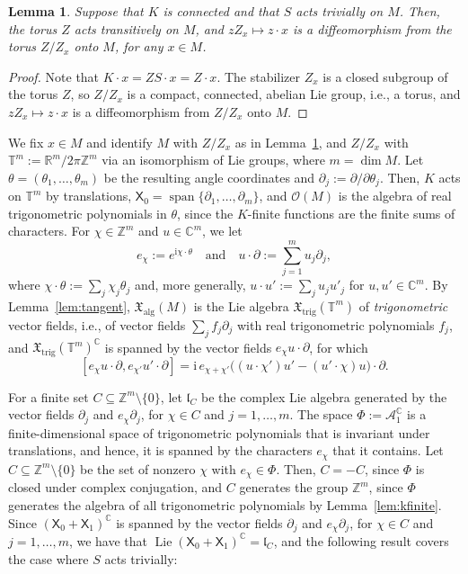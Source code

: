 \documentclass{article}
\newcommand{\R}{\mathbb{R}}
\newcommand{\C}{\mathbb{C}}
\newcommand{\Z}{\mathbb{Z}}
\newcommand{\T}{\mathbb{T}}
\newcommand{\xalg}{\mathfrak X_{\mathrm{alg}}}
\newcommand{\xtrig}{\mathfrak X_{\mathrm{trig}}}
\newcommand{\sX}{\mathsf{X}}
\newcommand{\Ocal}{\mathcal{O}}
\newtheorem{lemma}{Lemma}
\theoremstyle{definition}
\theoremstyle{plain}
\begin{document}
\begin{lemma}\label{lem:torus-structure}
 Suppose that $K$ is connected and that $S$ acts trivially on $M$.
Then, the torus $Z$ acts transitively on $M$, and $zZ_x\mapsto z\cdot x$ is a diffeomorphism from the torus $Z/Z_x$ onto $M$, for any $x\in M$.
\end{lemma}

\begin{proof}
 Note that $K\cdot x=ZS\cdot x=Z\cdot x$.
The stabilizer $Z_x$ is a closed subgroup of the torus $Z$, so $Z/Z_x$ is a compact, connected, abelian Lie group, i.e., a torus, and $zZ_x\mapsto z\cdot x$ is a diffeomorphism from $Z/Z_x$ onto $M$.
\end{proof}

We fix $x\in M$ and identify $M$ with $Z/Z_x$ as in Lemma~\ref{lem:torus-structure}, and $Z/Z_x$ with $\T^m:=\R^m/2\pi\Z^m$ via an isomorphism of Lie groups, where $m=\dim M$.
Let $\theta=(\theta_1,\ldots,\theta_m)$ be the resulting angle coordinates and $\partial_j:=\partial/\partial\theta_j$.
Then, $K$ acts on $\T^m$ by translations, $\sX_0=\operatorname{span}\{\partial_1,\ldots,\partial_m\}$,
and $\Ocal(M)$ is the algebra of real trigonometric polynomials in $\theta$, since the $K$-finite functions are the finite sums of characters.
For $\chi\in\Z^m$ and $u\in\C^m$, we let
$$
    e_\chi:=e^{\mathrm{i}\chi\cdot\theta}
    \quad\mbox{and}\quad
    u\cdot\partial:=\sum_{j=1}^mu_j\partial_j,
$$
where $\chi\cdot\theta:=\sum_j\chi_j\theta_j$ and, more generally, $u\cdot u':=\sum_ju_ju'_j$ for $u,u'\in\C^m$.
By Lemma~\ref{lem:tangent}, $\xalg(M)$ is the Lie algebra $\xtrig(\T^m)$ of {\it trigonometric} vector fields, i.e., of vector fields $\sum_jf_j\partial_j$ with real trigonometric polynomials $f_j$,
and $\xtrig(\T^m)^\C$ is spanned by the vector fields $e_\chi u\cdot\partial$, for which
\begin{equation}\label{eq:torus-bracket}
[e_\chi u\cdot\partial,e_{\chi'}u'\cdot\partial]=\mathrm{i}\,e_{\chi+\chi'}\bigl((u\cdot\chi')u'-(u'\cdot\chi)u\bigr)\cdot\partial.
\end{equation}

For a finite set $C\subseteq\Z^m\setminus\{0\}$, let $\mathfrak l_C$ be the complex Lie algebra generated by the vector fields $\partial_j$ and $e_\chi\partial_j$, for $\chi\in C$ and $j=1,\ldots,m$.
The space $\Phi:=\mathcal A_1^\C$ is a finite-dimensional space of trigonometric polynomials that is invariant under translations, and hence, it is spanned by the characters $e_\chi$ that it contains.
Let $C\subseteq\Z^m\setminus\{0\}$ be the set of nonzero $\chi$ with $e_\chi\in\Phi$.
Then, $C=-C$, since $\Phi$ is closed under complex conjugation, and $C$ generates the group $\Z^m$,
since $\Phi$ generates the algebra of all trigonometric polynomials by Lemma~\ref{lem:kfinite}.
Since $(\sX_0+\sX_1)^\C$ is spanned by the vector fields $\partial_j$ and $e_\chi\partial_j$, for $\chi\in C$ and $j=1,\ldots,m$, we have that $\operatorname{Lie}(\sX_0+\sX_1)^\C=\mathfrak l_C$, and the following result covers the case where $S$ acts trivially:
\end{document}
